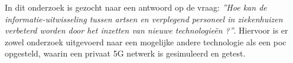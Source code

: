 
In dit onderzoek is gezocht naar een antwoord op de vraag: \textit{''Hoe kan de informatie-uitwisseling tussen artsen en verplegend personeel in ziekenhuizen verbeterd worden door het inzetten van nieuwe technologieën ?''}. Hiervoor is er zowel onderzoek uitgevoerd naar een mogelijke andere technologie als een \gls{poc} opgesteld, waarin een privaat 5G netwerk is gesimuleerd en getest. \\\\

